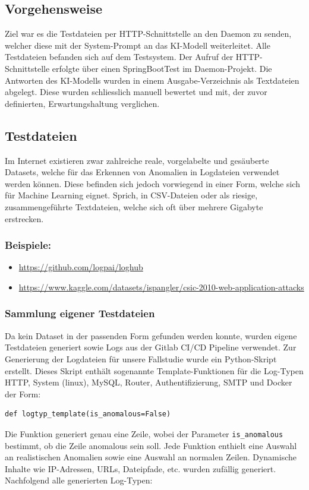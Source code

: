 \documentclass[a4paper,12pt]{report}
\begin{document}
    \subsection{Vorgehensweise}\label{subsec:vorgehensweise}
    Ziel war es die Testdateien per HTTP-Schnittstelle an den Daemon zu senden, welcher diese mit der System-Prompt an das KI-Modell weiterleitet.
    Alle Testdateien befanden sich auf dem Testsystem.
    Der Aufruf der HTTP-Schnittstelle erfolgte über einen SpringBootTest im Daemon-Projekt.
    Die Antworten des KI-Modells wurden in einem Ausgabe-Verzeichnis als Textdateien abgelegt.
    Diese wurden schliesslich manuell bewertet und mit, der zuvor definierten, Erwartungshaltung verglichen.

    \subsection{Testdateien}\label{subsec:testdateien}
    Im Internet existieren zwar zahlreiche reale, vorgelabelte und gesäuberte Datasets, welche für das Erkennen von Anomalien in Logdateien verwendet werden können.
    Diese befinden sich jedoch vorwiegend in einer Form, welche sich für Machine Learning eignet.
    Sprich, in CSV-Dateien oder als riesige, zusammengeführte Textdateien, welche sich oft über mehrere Gigabyte erstrecken.
    \subsubsection{Beispiele:}
    \begin{itemize}
        \item \url{https://github.com/logpai/loghub}
        \item \url{https://www.kaggle.com/datasets/ispangler/csic-2010-web-application-attacks}
    \end{itemize}

    \subsubsection{Sammlung eigener Testdateien}
    Da kein Dataset in der passenden Form gefunden werden konnte, wurden eigene Testdateien generiert sowie Logs aus der Gitlab CI/CD Pipeline verwendet.
    Zur Generierung der Logdateien für unsere Fallstudie wurde ein Python-Skript erstellt.
    Dieses Skript enthält sogenannte Template-Funktionen für die Log-Typen HTTP, System (linux), MySQL, Router, Authentifizierung, SMTP und Docker der Form:
    \begin{verbatim}def logtyp_template(is_anomalous=False)\end{verbatim}
    Die Funktion generiert genau eine Zeile, wobei der Parameter \texttt{is\_anomalous} bestimmt, ob die Zeile anomalous sein soll.
    Jede Funktion enthielt eine Auswahl an realistischen Anomalien sowie eine Auswahl an normalen Zeilen.
    Dynamische Inhalte wie IP-Adressen, URLs, Dateipfade, etc. wurden zufällig generiert.
    Nachfolgend alle generierten Log-Typen:
\end{document}
